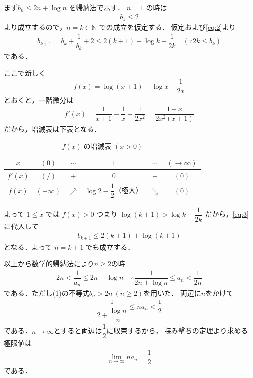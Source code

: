 \documentclass[../../main.tex]{subfiles}
\begin{document}
まず$b_n \le 2n + \log n$ を帰納法で示す．
$n=1$ の時は
\begin{align}
  b_1 \le 2
\end{align}
より成立するので，$n = k \in \mathbb{N}$ での成立を仮定する．
仮定および\cref{eq:2}より
\begin{align}
  b_{k+1}
  = b_k + \dfrac{1}{b_k} + 2
  \le 2(k+1) + \log k + \dfrac{1}{2k} \quad (\because 2k \le b_k) \label{eq:3}
\end{align}
である．

ここで新しく
\begin{align}
  f(x) = \log(x+1) - \log x - \dfrac{1}{2x}
\end{align}
とおくと，一階微分は
\begin{align}
  f'(x)
  = \dfrac{1}{x+1} - \dfrac{1}{x} + \dfrac{1}{2x^2}
  = \dfrac{1-x}{2x^2(x+1)}
\end{align}
だから，増減表は下表となる．

\begin{table}[htb]
  \centering
  \caption{$f(x)$ の増減表 $(x > 0)$}
  \label{tab:fx_monotonicity}
  \renewcommand{\arraystretch}{1.5}
  \begin{tabular}{|c|c|c|c|c|c|}
    \hline
    $x$      & $(0)$       & $\cdots$   & $1$                  & $\cdots$   & $(\to\infty)$ \\ \hline
    $f'(x)$  & $(/)$       & $+$        & $0$                  & $-$        & $(0)$         \\ \hline
    $f(x)$   & $(-\infty)$ & $\nearrow$ & $\log 2 - \dfrac{1}{2}$（極大） & $\searrow$ & $(0)$         \\ \hline
  \end{tabular}
\end{table}

よって $1 \le x$ では $f(x) > 0$ つまり $\log(k+1) > \log k + \dfrac{1}{2k}$ だから，\cref{eq:3}に代入して
\begin{align}
  b_{k+1} \le 2(k+1) + \log(k+1)
\end{align}
となる．よって $n=k+1$ でも成立する．

以上から数学的帰納法により$n\ge2$の時
\begin{align}
  2n < \dfrac{1}{a_n} \le 2n + \log n
  \quad \therefore
  \dfrac{1}{2n+\log n} \le a_n < \dfrac{1}{2n}
\end{align}
である．ただし(1)の不等式$b_n>2n \ (n \ge 2)$を用いた．
両辺に$n$をかけて
\begin{align}
  \dfrac{1}{2+\dfrac{\log n}{n}} \le na_n < \dfrac{1}{2}
\end{align}
である．$n\to\infty$とすると両辺は$\dfrac{1}{2}$に収束するから，
挟み撃ちの定理より求める極限値は
\begin{align}
  \lim_{n\to\infty} n a_n = \dfrac{1}{2}
\end{align}
である．
\end{document}
